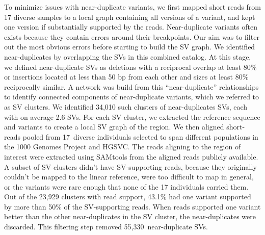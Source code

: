 \documentclass[11pt]{ucscthesis}
\begin{document}
To minimize issues with near-duplicate variants, we first mapped short reads from 17 diverse samples to a local graph containing all versions of a variant, and kept one version if substantially supported by the reads.
Near-duplicate variants often exists because they contain errors around their breakpoints.
Our aim was to filter out the most obvious errors before starting to build the SV graph.
We identified near-duplicates by overlapping the SVs in this combined catalog.
At this stage, we defined near-duplicate SVs as deletions with a reciprocal overlap at least 80\% or insertions located at less than 50 bp from each other and sizes at least 80\% reciprocally similar.
A network was build from this ``near-duplicate'' relationships to identify connected components of near-duplicate variants, which we referred to as SV clusters.
We identified 34,010 such clusters of near-duplicates SVs, each with on average 2.6 SVs.
For each SV cluster, we extracted the reference sequence and variants to create a local SV graph of the region.
We then aligned short-reads pooled from 17~diverse individuals selected to span different populations in the 1000 Genomes Project and HGSVC.
The reads aligning to the region of interest were extracted using SAMtools\cite{li_samtools_2011} from the aligned reads publicly available.
A subset of SV clusters didn't have SV-supporting reads, because they originally couldn't be mapped to the linear reference, were too difficult to map in general, or the variants were rare enough that none of the 17 individuals carried them.
Out of the 23,929 clusters with read support, 43.1\% had one variant supported by more than 50\% of the SV-supporting reads.
When reads supported one variant better than the other near-duplicates in the SV cluster, the near-duplicates were discarded.
This filtering step removed 55,330~near-duplicate SVs.
\end{document}
